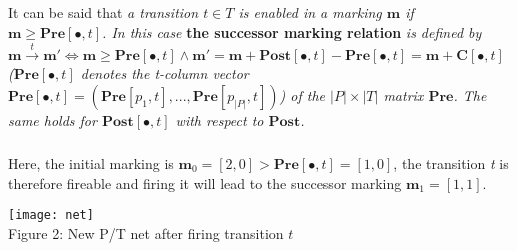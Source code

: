 \documentclass{article}
\begin{document}
	\subparagraph{}It can be said that \textit{a transition $\mathit{t}\in\mathit{T}$ is enabled in a marking $\mathbf{m}$ if $\mathbf{m}\geq\mathbf{Pre}[\bullet,\mathit{t}]$. In this case } \textbf{the successor marking relation} \textit{is defined by $\mathbf{m}\xrightarrow{t}\textbf{m}'\Leftrightarrow \mathbf{m}\geq\mathbf{Pre}[\bullet,t]\land\mathbf{m}'=\mathbf{m}+\mathbf{Post}[\bullet,t]-\mathbf{Pre}[\bullet,t]=\mathbf{m}+\mathbf{C}[\bullet,t]$ ($\mathbf{Pre}[\bullet,t]$ denotes the t-column vector $ \mathbf{Pre}[\bullet,\mathit{t}]=(\mathbf{Pre}[p_{1},t],...,\mathbf{Pre}[p_{|P|},t])$) of the $|P|\times|T|$ matrix $\mathbf{Pre}$. The same holds for $\mathbf{Post}[\bullet,t]$ with respect to $\mathbf{Post}$.}
	\subparagraph{}Here, the initial marking is $\mathbf{m}_{0}=[2,0]>\mathbf{Pre}[\bullet,t]=[1,0]$, the transition \textit{t} is therefore fireable and firing it will lead to the successor marking $\mathbf{m}_{1}=[1,1]$.
	\begin{center}
		\texttt{[image: net]}
		\\Figure 2: New P/T net after firing transition $t$
	\end{center}
\end{document}

